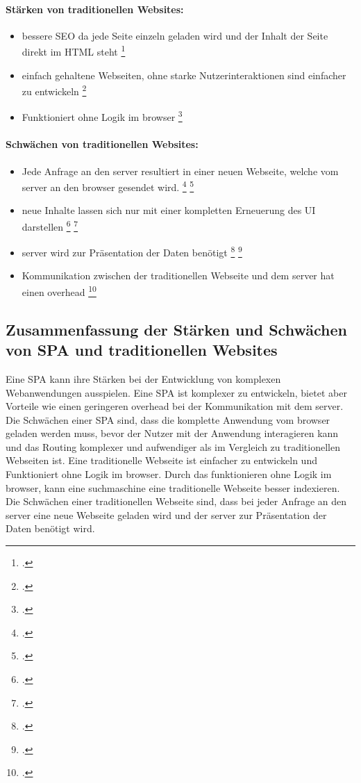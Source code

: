\paragraph*{Stärken von traditionellen Websites:}

\begin{itemize}
    \item bessere \ac{SEO} da jede Seite einzeln geladen wird und der Inhalt der Seite direkt im \ac{HTML} steht \footcite[Vgl. ][Seite 7]{Smith2022}
    \item einfach gehaltene Webseiten, ohne starke Nutzerinteraktionen sind einfacher zu entwickeln \footcite[Vgl. ][Seite 7]{Smith2022}
    \item Funktioniert ohne Logik im \gls{browser} \footcite[Vgl. ][Seite 7]{Smith2022}
\end{itemize}

\paragraph*{Schwächen von traditionellen Websites:}

\begin{itemize}
    \item Jede Anfrage an den \gls{server} resultiert in einer neuen Webseite, welche vom \gls{server} an den \gls{browser} gesendet wird. \footcite[Vgl. ][Seite 5]{Flanagan2011} \footcite[Vgl. ][Seite 33]{Robbins2018}
    \item neue Inhalte lassen sich nur mit einer kompletten Erneuerung des \ac{UI} darstellen \footcite[Vgl. ][Seite 6]{Flanagan2011} \footcite[Vgl. ][Seite 33]{Robbins2018}
    \item \gls{server} wird zur Präsentation der Daten benötigt \footcite[Vgl. ][Seite 7]{Flanagan2011} \footcite[Vgl. ][Seite 33]{Robbins2018}
    \item Kommunikation zwischen der traditionellen Webseite und dem \gls{server} hat einen \gls{overhead} \footcite[Vgl. ][Seite 7]{Flanagan2011}
\end{itemize}

\subsection*{Zusammenfassung der Stärken und Schwächen von \ac{SPA} und traditionellen Websites}
Eine \ac{SPA} kann ihre Stärken bei der Entwicklung von komplexen Webanwendungen ausspielen.
Eine \ac{SPA} ist komplexer zu entwickeln, bietet aber Vorteile wie einen geringeren \gls{overhead} bei der Kommunikation mit dem \gls{server}.
Die Schwächen einer \ac{SPA} sind, dass die komplette Anwendung vom \gls{browser} geladen werden muss, bevor der Nutzer mit der Anwendung interagieren kann
und das Routing komplexer und aufwendiger als im Vergleich zu traditionellen Webseiten ist.
Eine traditionelle Webseite ist einfacher zu entwickeln und Funktioniert ohne Logik im \gls{browser}.
Durch das funktionieren ohne Logik im \gls{browser}, kann eine \gls{suchmaschine} eine traditionelle Webseite besser indexieren.
Die Schwächen einer traditionellen Webseite sind, dass bei jeder Anfrage an den \gls{server} eine neue Webseite geladen wird und der \gls{server} zur Präsentation der Daten benötigt wird.
